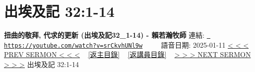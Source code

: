 \documentclass{book}
\begin{document}
\section{出埃及記 32:1-14}
\label{sec:srCkvhUNl9w}
\textbf{扭曲的敬拜, 代求的更新 (出埃及記32\_1-14) -  賴若瀚牧師}
\newline
\newline
連結: \href{https://youtube.com/watch?v=srCkvhUNl9w}{\texttt{ https://youtube.com/watch?v=srCkvhUNl9w}} ~~~~ 語音日期: 2025-01-11 
\newline
\newline
\hyperref[sec:yRzXvTTOZfM]{< < < PREV SERMON < < <}
~
\hyperlink{toc}{[返主目錄]}
~
\hyperref[ch:preacher12]{[返講員目錄]}
~
\hyperref[sec:4994BMikpLI]{> > > NEXT SERMON > > >}
\newline
\newline
出埃及記 32:1-14
\newline
\end{document}
